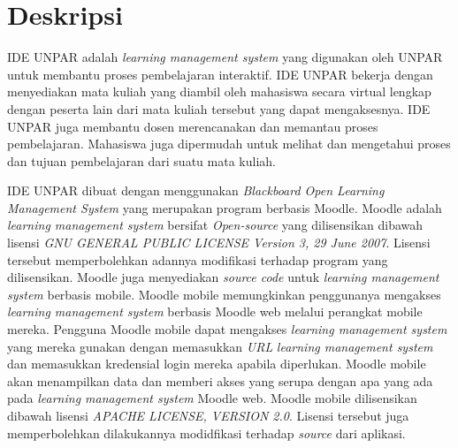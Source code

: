 \documentclass[a4paper,twoside]{article}
\begin{document}
\title{\@judultopik}
\author{\nama \textendash \@npm} 

\newcommand{\nama}{Gabriel Panji Lazuardi}
\newcommand{\@npm}{2016730068}
\newcommand{\@judultopik}{Aplikasi mobile IDE UNPAR berbasis Moodle App} %
\newcommand{\jumpemb}{1} %
\newcommand{\tanggal}{24/09/2020}


\maketitle


\section{Deskripsi}
IDE UNPAR adalah \textit{learning management system} yang digunakan oleh UNPAR untuk membantu proses pembelajaran interaktif. IDE UNPAR bekerja dengan menyediakan mata kuliah yang diambil oleh mahasiswa secara virtual lengkap dengan peserta lain dari mata kuliah tersebut yang dapat mengaksesnya. IDE UNPAR juga membantu dosen merencanakan dan memantau proses pembelajaran. Mahasiswa juga dipermudah untuk melihat dan mengetahui proses dan tujuan pembelajaran dari suatu mata kuliah.

IDE UNPAR dibuat dengan menggunakan \textit{Blackboard Open Learning Management System} yang merupakan program berbasis Moodle. Moodle adalah \textit{learning management system} bersifat \textit{Open-source} yang dilisensikan dibawah lisensi \textit{GNU GENERAL PUBLIC LICENSE Version 3, 29 June 2007}. Lisensi tersebut memperbolehkan adannya modifikasi terhadap program yang dilisensikan. Moodle juga menyediakan \textit{source code} untuk \textit{learning management system} berbasis mobile. Moodle mobile memungkinkan penggunanya mengakses \textit{learning management system} berbasis Moodle web melalui perangkat mobile mereka. Pengguna Moodle mobile dapat mengakses \textit{learning management system} yang mereka gunakan dengan memasukkan \textit{URL} \textit{learning management system} dan memasukkan kredensial login mereka apabila diperlukan. Moodle mobile akan menampilkan data dan memberi akses yang serupa dengan apa yang ada pada \textit{learning management system} Moodle web. Moodle mobile dilisensikan dibawah lisensi   \textit{APACHE LICENSE, VERSION 2.0}. Lisensi tersebut juga memperbolehkan dilakukannya modidfikasi terhadap \textit{source} dari aplikasi.
\end{document}
